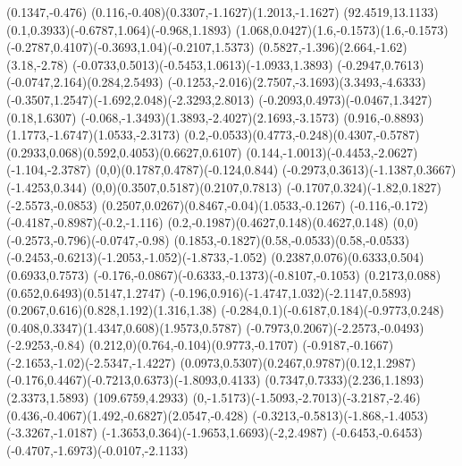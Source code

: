 {    \rlineto(0.1347,-0.476)
    \rcurveto(0.116,-0.408)(0.3307,-1.1627)(1.2013,-1.1627)
    \closepath
    \moveto(92.4519,13.1133)%
    \rcurveto(0.1,0.3933)(-0.6787,1.064)(-0.968,1.1893)
    \rcurveto(1.068,0.0427)(1.6,-0.1573)(1.6,-0.1573)
    \rcurveto(-0.2787,0.4107)(-0.3693,1.04)(-0.2107,1.5373)
    \rcurveto(0.5827,-1.396)(2.664,-1.62)(3.18,-2.78)
    \rcurveto(-0.0733,0.5013)(-0.5453,1.0613)(-1.0933,1.3893)
    \rcurveto(-0.2947,0.7613)(-0.0747,2.164)(0.284,2.5493)
    \rcurveto(-0.1253,-2.016)(2.7507,-3.1693)(3.3493,-4.6333)
    \rcurveto(-0.3507,1.2547)(-1.692,2.048)(-2.3293,2.8013)
    \rcurveto(-0.2093,0.4973)(-0.0467,1.3427)(0.18,1.6307)
    \rcurveto(-0.068,-1.3493)(1.3893,-2.4027)(2.1693,-3.1573)
    \rcurveto(0.916,-0.8893)(1.1773,-1.6747)(1.0533,-2.3173)
    \rcurveto(0.2,-0.0533)(0.4773,-0.248)(0.4307,-0.5787)
    \rcurveto(0.2933,0.068)(0.592,0.4053)(0.6627,0.6107)
    \rcurveto(0.144,-1.0013)(-0.4453,-2.0627)(-1.104,-2.3787)
    \rcurveto(0,0)(0.1787,0.4787)(-0.124,0.844)
    \rcurveto(-0.2973,0.3613)(-1.1387,0.3667)(-1.4253,0.344)
    \rcurveto(0,0)(0.3507,0.5187)(0.2107,0.7813)
    \rcurveto(-0.1707,0.324)(-1.82,0.1827)(-2.5573,-0.0853)
    \rcurveto(0.2507,0.0267)(0.8467,-0.04)(1.0533,-0.1267)
    \rcurveto(-0.116,-0.172)(-0.4187,-0.8987)(-0.2,-1.116)
    \rcurveto(0.2,-0.1987)(0.4627,0.148)(0.4627,0.148)
    \rcurveto(0,0)(-0.2573,-0.796)(-0.0747,-0.98)
    \rcurveto(0.1853,-0.1827)(0.58,-0.0533)(0.58,-0.0533)
    \rcurveto(-0.2453,-0.6213)(-1.2053,-1.052)(-1.8733,-1.052)
    \rcurveto(0.2387,0.076)(0.6333,0.504)(0.6933,0.7573)
    \rcurveto(-0.176,-0.0867)(-0.6333,-0.1373)(-0.8107,-0.1053)
    \rcurveto(0.2173,0.088)(0.652,0.6493)(0.5147,1.2747)
    \rcurveto(-0.196,0.916)(-1.4747,1.032)(-2.1147,0.5893)
    \rcurveto(0.2067,0.616)(0.828,1.192)(1.316,1.38)
    \rcurveto(-0.284,0.1)(-0.6187,0.184)(-0.9773,0.248)
    \rcurveto(0.408,0.3347)(1.4347,0.608)(1.9573,0.5787)
    \rcurveto(-0.7973,0.2067)(-2.2573,-0.0493)(-2.9253,-0.84)
    \rcurveto(0.212,0)(0.764,-0.104)(0.9773,-0.1707)
    \rcurveto(-0.9187,-0.1667)(-2.1653,-1.02)(-2.5347,-1.4227)
    \rcurveto(0.0973,0.5307)(0.2467,0.9787)(0.12,1.2987)
    \rcurveto(-0.176,0.4467)(-0.7213,0.6373)(-1.8093,0.4133)
    \rcurveto(0.7347,0.7333)(2.236,1.1893)(2.3373,1.5893)
    \moveto(109.6759,4.2933)%
    \rcurveto(0,-1.5173)(-1.5093,-2.7013)(-3.2187,-2.46)
    \rcurveto(0.436,-0.4067)(1.492,-0.6827)(2.0547,-0.428)
    \rcurveto(-0.3213,-0.5813)(-1.868,-1.4053)(-3.3267,-1.0187)
    \rcurveto(-1.3653,0.364)(-1.9653,1.6693)(-2,2.4987)
    \rcurveto(-0.6453,-0.6453)(-0.4707,-1.6973)(-0.0107,-2.1133)
}
